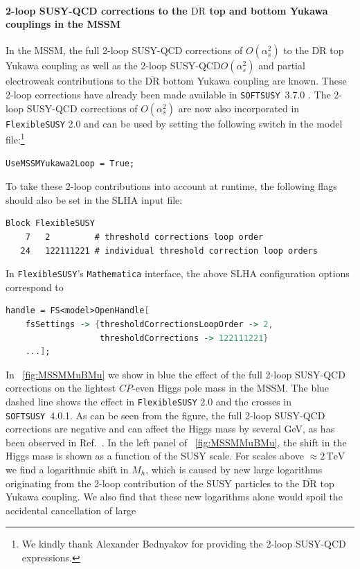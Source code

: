 \documentclass[final,3p,11pt,pdflatex]{elsarticle}
\makeatletter
\newcommand{\fs}{\texttt{FlexibleSUSY}\@\xspace}
\newcommand{\softsusy}{\texttt{SOFTSUSY}\@\xspace}
\newcommand{\fstwo}{\fs 2.0\@\xspace}
\newcommand{\mathematica}{\texttt{Ma\-the\-ma\-ti\-ca}\xspace}
\newcommand{\ol}[1]{\overline{#1}}
\newcommand{\DRbar}{\ensuremath{\ol{\text{DR}}}\xspace}
\newcommand{\unit}[1]{\,\text{#1}}      %
\newcommand{\figref}[1]{\figurename~\ref{#1}}
\newcommand{\CP}{\ensuremath{CP}\xspace}
\newcommand{\SQCD}{SUSY-QCD\xspace}
\def\as{\alpha_s}
\makeatother
\begin{document}
\paragraph{2-loop \SQCD corrections to the \DRbar top and bottom Yukawa couplings in the MSSM}
In the MSSM, the full 2-loop \SQCD corrections of $O(\as^2)$
to the \DRbar top Yukawa coupling
\cite{Bednyakov:2007vm,Bednyakov:2002sf,Bednyakov:2005kt} as well as
the 2-loop \SQCD $O(\as^2)$ and partial electroweak contributions
to the \DRbar bottom Yukawa coupling \cite{Bednyakov:2009wt} are
known.  These 2-loop corrections have already been made available in
\softsusy~3.7.0 \cite{Allanach:2014nba}.  The 2-loop \SQCD
corrections of $O(\as^2)$ are now also incorporated in \fstwo and can be
used by setting the following switch in the model file:\footnote{We
  kindly thank Alexander Bednyakov for providing the 2-loop \SQCD
  expressions.}
%
\begin{lstlisting}
UseMSSMYukawa2Loop = True;
\end{lstlisting}
%
To take these 2-loop contributions into account at runtime, the
following flags should also be set in the SLHA input file:
%
\begin{lstlisting}
Block FlexibleSUSY
    7   2         # threshold corrections loop order
   24   122111221 # individual threshold correction loop orders
\end{lstlisting}
%
In \fs's \mathematica interface, the above SLHA configuration options
correspond to
%
\begin{lstlisting}[language=Mathematica]
handle = FS<model>OpenHandle[
    fsSettings -> {thresholdCorrectionsLoopOrder -> 2,
                   thresholdCorrections -> 122111221}
    ...];
\end{lstlisting}
%
In \figref{fig:MSSMMuBMu} we show in blue the effect of the full
2-loop \SQCD corrections on the lightest \CP-even Higgs pole mass in
the MSSM\@.  The blue dashed line shows the effect in \fstwo and the
crosses in \softsusy~4.0.1.
As can be seen from the figure, the full 2-loop \SQCD corrections are
negative and can affect the Higgs mass by several GeV, as has been
observed in Ref.~\cite{Allanach:2014nba}.  In the left panel of
\figref{fig:MSSMMuBMu}, the shift in the Higgs mass is shown as a
function of the SUSY scale.  For scales above $\approx 2\unit{TeV}$ we
find a logarithmic shift in $M_h$, which is caused by new large
logarithms originating from the 2-loop contribution of the SUSY
particles to the \DRbar top Yukawa coupling.  We also find that these
new logarithms alone would spoil the accidental cancellation of large
\end{document}

